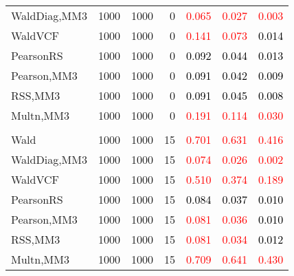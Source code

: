 \documentclass[
]{article}
\begin{document}
\begin{table}[H]
{\begin{tabular}[t]{lrrrrrr}
\hspace{1em}WaldDiag,MM3 & 1000 & 1000 & 0 & \textcolor{red}{0.065} & \textcolor{red}{0.027} & \textcolor{red}{0.003}\\
\hspace{1em}WaldVCF & 1000 & 1000 & 0 & \textcolor{red}{0.141} & \textcolor{red}{0.073} & \textcolor{black}{0.014}\\
\hspace{1em}PearsonRS & 1000 & 1000 & 0 & \textcolor{black}{0.092} & \textcolor{black}{0.044} & \textcolor{black}{0.013}\\
\hspace{1em}Pearson,MM3 & 1000 & 1000 & 0 & \textcolor{black}{0.091} & \textcolor{black}{0.042} & \textcolor{black}{0.009}\\
\hspace{1em}RSS,MM3 & 1000 & 1000 & 0 & \textcolor{black}{0.091} & \textcolor{black}{0.045} & \textcolor{black}{0.008}\\
\hspace{1em}Multn,MM3 & 1000 & 1000 & 0 & \textcolor{red}{0.191} & \textcolor{red}{0.114} & \textcolor{red}{0.030}\\
\addlinespace[0.3em]
\multicolumn{7}{l}{\textbf{1F 15V}}\\
\hspace{1em}Wald & 1000 & 1000 & 15 & \textcolor{red}{0.701} & \textcolor{red}{0.631} & \textcolor{red}{0.416}\\
\hspace{1em}WaldDiag,MM3 & 1000 & 1000 & 15 & \textcolor{red}{0.074} & \textcolor{red}{0.026} & \textcolor{red}{0.002}\\
\hspace{1em}WaldVCF & 1000 & 1000 & 15 & \textcolor{red}{0.510} & \textcolor{red}{0.374} & \textcolor{red}{0.189}\\
\hspace{1em}PearsonRS & 1000 & 1000 & 15 & \textcolor{black}{0.084} & \textcolor{black}{0.037} & \textcolor{black}{0.010}\\
\hspace{1em}Pearson,MM3 & 1000 & 1000 & 15 & \textcolor{red}{0.081} & \textcolor{red}{0.036} & \textcolor{black}{0.010}\\
\hspace{1em}RSS,MM3 & 1000 & 1000 & 15 & \textcolor{red}{0.081} & \textcolor{red}{0.034} & \textcolor{black}{0.012}\\
\hspace{1em}Multn,MM3 & 1000 & 1000 & 15 & \textcolor{red}{0.709} & \textcolor{red}{0.641} & \textcolor{red}{0.430}\\

\end{tabular}}
\end{table}
\end{document}
